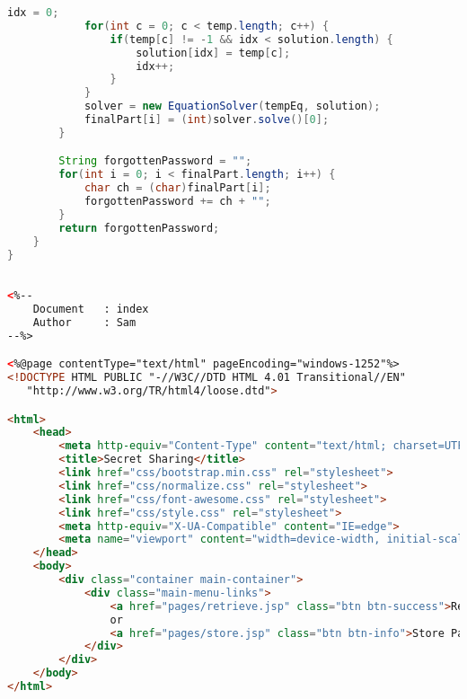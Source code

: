 \begin{lstlisting}[language=Java,basicstyle=\tiny,caption=SecretSharing.java]
            idx = 0;
            for(int c = 0; c < temp.length; c++) {
                if(temp[c] != -1 && idx < solution.length) {
                    solution[idx] = temp[c];
                    idx++;
                }
            }
            solver = new EquationSolver(tempEq, solution);
            finalPart[i] = (int)solver.solve()[0];
        }

        String forgottenPassword = "";
        for(int i = 0; i < finalPart.length; i++) {
            char ch = (char)finalPart[i];
            forgottenPassword += ch + "";
        }
        return forgottenPassword;
    }
}

\end{lstlisting}

\begin{lstlisting}[language=HTML,basicstyle=\tiny,caption=index.jsp]

<%-- 
    Document   : index
    Author     : Sam
--%>

<%@page contentType="text/html" pageEncoding="windows-1252"%>
<!DOCTYPE HTML PUBLIC "-//W3C//DTD HTML 4.01 Transitional//EN"
   "http://www.w3.org/TR/html4/loose.dtd">

<html>
    <head>
        <meta http-equiv="Content-Type" content="text/html; charset=UTF-8">
        <title>Secret Sharing</title>
        <link href="css/bootstrap.min.css" rel="stylesheet">
        <link href="css/normalize.css" rel="stylesheet">
        <link href="css/font-awesome.css" rel="stylesheet">
        <link href="css/style.css" rel="stylesheet">
        <meta http-equiv="X-UA-Compatible" content="IE=edge">
        <meta name="viewport" content="width=device-width, initial-scale=1">
    </head>
    <body>
        <div class="container main-container">
            <div class="main-menu-links">
                <a href="pages/retrieve.jsp" class="btn btn-success">Retrieve Password</a>
                or
                <a href="pages/store.jsp" class="btn btn-info">Store Password</a>
            </div>
        </div>
    </body>
</html>

\end{lstlisting}

